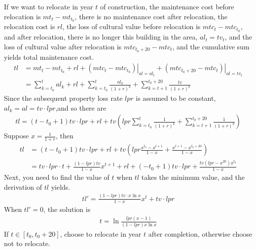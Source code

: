 \documentclass[12pt]{article}  %
\begin{document}
If we want to relocate in year $t$ of construction, the maintenance cost before relocation is $mt_t-mt_{t_0}$, there is no maintenance cost after relocation, the relocation cost is $rl$, the loss of cultural value before relocation is $mtc_t-mtc_{t_0}$, and after relocation, there is no longer this building in the area, $al_t=tv_t$, and the loss of cultural value after relocation is $mtc_{t_0+20}-mtc_{t}$, and the cumulative sum yields total maintenance cost.
\begin{equation*}
\begin{split}
    tl
    &= mt_t-mt_{t_0}+rl+\left.(mtc_{t}-mtc_{t_0})\right|_{al=al_t}+\left.(mtc_{t_0+20}-mtc_{t})\right|_{al=tv_t} \\
    &= \sum\limits_{k=t_0}^t al_k+rl+\sum\limits_{k=t_0}^t  \frac{al_k}{(1+r)^k}+\sum\limits_{k=t+1}^{t_0+20}  \frac{tv}{(1+r)^k}
\end{split}
\end{equation*}
Since the subsequent property loss rate $lpr$ is assumed to be constant, $al_k=al=tv \cdot lpr$,and so there are
\begin{align*}
    tl=(t-t_0+1)tv \cdot lpr+rl+tv(lpr \sum\limits_{k=t_0}^t  \frac{1}{(1+r)^k}+ \sum\limits_{k=t+1}^{t_0+20}  \frac{1}{(1+r)^k})
\end{align*}
Suppose $x= \frac{1}{1+r}$, then
\begin{align*}
    tl
    &=(t-t_0+1)tv \cdot lpr+rl+tv(lpr  \frac{x^{t_0}-x^{t+1}}{1-x} + \frac{x^{t+1}-x^{t_0+20}}{1-x}) \\
    &= tv \cdot lpr \cdot t+ \frac{(1-lpr)tv}{1-x}x^{t+1} +rl+(-t_0+1)tv \cdot lpr+ \frac{tv(lpr-x^{20})x^{t_0}}{1-x}
\end{align*}
Next, you need to find the value of $t$ when $tl$ takes the minimum value, and the derivation of $tl$ yields.
\begin{align*}
    tl'= \frac{(1-lpr)tv \cdot x \ln x}{1-x}x^t+tv \cdot lpr
\end{align*}
When $tl' = 0$, the solution is
\begin{align*}
    t=\ln  \frac{lpr(x-1)}{(1-lpr)x\ln x}
\end{align*}
If $t \in [t_0,t_0+20]$, choose to relocate in year $t$ after completion, otherwise choose not to relocate.
\end{document}
